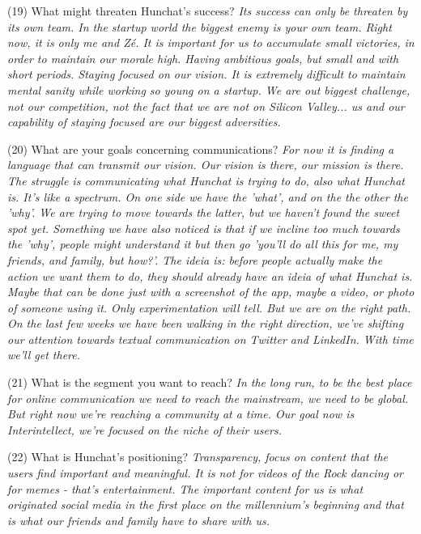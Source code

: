 \documentclass[11pt]{article}
\begin{document}
(19) What might threaten Hunchat’s success? \textit{Its success can only be threaten by its own team. In the startup world the biggest enemy is your own team. Right now, it is only me and Zé. It is important for us to accumulate small victories, in order to maintain our morale high. Having ambitious goals, but small and with short periods. Staying focused on our vision. It is extremely difficult to maintain mental sanity while working so young on a startup. We are out biggest challenge, not our competition, not the fact that we are not on Silicon Valley... us and our capability of staying focused are our biggest adversities.}

(20) What are your goals concerning communications? \textit{For now it is finding a language that can transmit our vision. Our vision is there, our mission is there. The struggle is communicating what Hunchat is trying to do, also what Hunchat is. It's like a spectrum. On one side we have the 'what', and on the the other the 'why'. We are trying to move towards the latter, but we haven't found the sweet spot yet. Something we have also noticed is that if we incline too much towards the 'why', people might understand it but then go 'you'll do all this for me, my friends, and family, but how?'. The ideia is: before people actually make the action we want them to do, they should already have an ideia of what Hunchat is. Maybe that can be done just with a screenshot of the app, maybe a video, or photo of someone using it. Only experimentation will tell. But we are on the right path. On the last few weeks we have been walking in the right direction, we've shifting our attention towards textual communication on Twitter and LinkedIn. With time we'll get there.}

(21) What is the segment you want to reach? \textit{In the long run, to be the best place for online communication we need to reach the mainstream, we need to be global. But right now we're reaching a community at a time. Our goal now is Interintellect, we're focused on the niche of their users.}

(22) What is Hunchat’s positioning? \textit{Transparency, focus on content that the users find important and meaningful. It is not for videos of the Rock dancing or for memes - that's entertainment. The important content for us is what originated social media in the first place on the millennium's beginning and that is what our friends and family have to share with us.}
\end{document}

